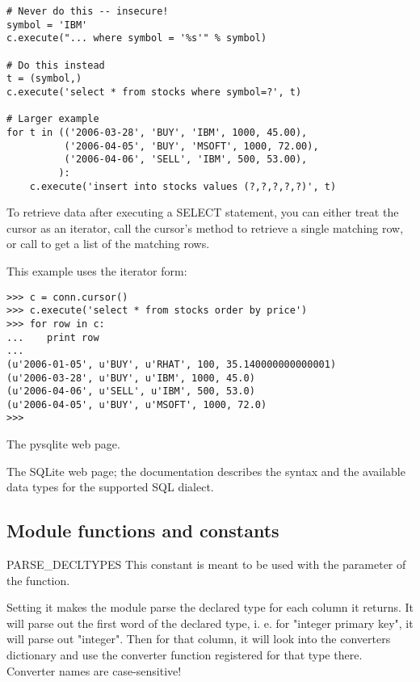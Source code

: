 \begin{verbatim}    
# Never do this -- insecure!
symbol = 'IBM'
c.execute("... where symbol = '%s'" % symbol)

# Do this instead
t = (symbol,)
c.execute('select * from stocks where symbol=?', t)

# Larger example
for t in (('2006-03-28', 'BUY', 'IBM', 1000, 45.00),
          ('2006-04-05', 'BUY', 'MSOFT', 1000, 72.00),
          ('2006-04-06', 'SELL', 'IBM', 500, 53.00),
         ):
    c.execute('insert into stocks values (?,?,?,?,?)', t)
\end{verbatim}

To retrieve data after executing a SELECT statement, you can either 
treat the cursor as an iterator, call the cursor's 
method to retrieve a single matching row, 
or call  to get a list of the matching rows.

This example uses the iterator form:

\begin{verbatim}
>>> c = conn.cursor()
>>> c.execute('select * from stocks order by price')
>>> for row in c:
...    print row
...
(u'2006-01-05', u'BUY', u'RHAT', 100, 35.140000000000001)
(u'2006-03-28', u'BUY', u'IBM', 1000, 45.0)
(u'2006-04-06', u'SELL', u'IBM', 500, 53.0)
(u'2006-04-05', u'BUY', u'MSOFT', 1000, 72.0)
>>>
\end{verbatim}

\begin{seealso}

{The pysqlite web page.}

{The SQLite web page; the documentation describes the syntax and the
available data types for the supported SQL dialect.}


\end{seealso}


\subsection{Module functions and constants\label{sqlite3-Module-Contents}}

\begin{datadesc}{PARSE_DECLTYPES}
This constant is meant to be used with the  parameter of the
 function.

Setting it makes the  module parse the declared type for each column it
returns.  It will parse out the first word of the declared type, i. e. for
"integer primary key", it will parse out "integer". Then for that column, it
will look into the converters dictionary and use the converter function
registered for that type there.  Converter names are case-sensitive!
\end{datadesc}


